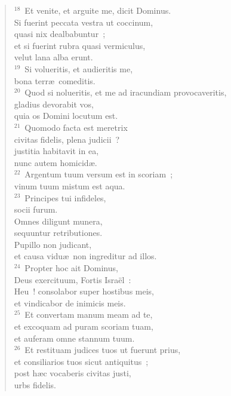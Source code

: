 \begin{flushleft}\begin{verse}${}^{18}$~Et venite, et arguite me, dicit Dominus.\\ Si fuerint peccata vestra ut coccinum,\\ quasi nix dealbabuntur~;\\ et si fuerint rubra quasi vermiculus,\\ velut lana alba erunt.\\
${}^{19}$~Si volueritis, et audieritis me,\\ bona terr\ae\ comeditis.\\
${}^{20}$~Quod si nolueritis, et me ad iracundiam provocaveritis,\\ gladius devorabit vos,\\ quia os Domini locutum est.\\
${}^{21}$~Quomodo facta est meretrix\\ civitas fidelis, plena judicii~?\\ justitia habitavit in ea,\\ nunc autem homicid\ae .\\
${}^{22}$~Argentum tuum versum est in scoriam~;\\ vinum tuum mistum est aqua.\\
${}^{23}$~Principes tui infideles,\\ socii furum.\\ Omnes diligunt munera,\\ sequuntur retributiones.\\ Pupillo non judicant,\\ et causa vidu\ae\ non ingreditur ad illos.\\
${}^{24}$~Propter hoc ait Dominus,\\ Deus exercituum, Fortis Isra\"el~:\\ Heu~! consolabor super hostibus meis,\\ et vindicabor de inimicis meis.\\
${}^{25}$~Et convertam manum meam ad te,\\ et excoquam ad puram scoriam tuam,\\ et auferam omne stannum tuum.\\
${}^{26}$~Et restituam judices tuos ut fuerunt prius,\\ et consiliarios tuos sicut antiquitus~;\\ post h\ae c vocaberis civitas justi,\\ urbs fidelis.\\

\end{verse}
\end{flushleft}
